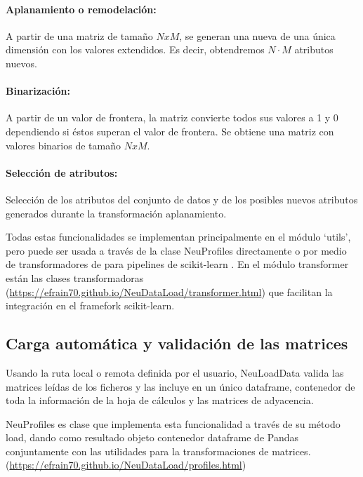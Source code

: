 \paragraph{Aplanamiento o remodelación:}
A partir de una matriz de tamaño $NxM$, se generan una nueva de una única dimensión con los valores extendidos. Es decir, obtendremos $N·M$ atributos nuevos.

\paragraph{Binarización:} A partir de un valor de frontera, la matriz convierte todos sus valores a 1 y 0 dependiendo si éstos superan el valor de frontera. Se obtiene una matriz con valores binarios de tamaño $NxM$.

\paragraph{Selección de atributos:} Selección de los atributos del conjunto de datos y de los posibles nuevos atributos generados durante la transformación aplanamiento. 

Todas estas funcionalidades se implementan principalmente en el módulo ‘utils’, pero puede ser usada a través de la clase NeuProfiles directamente o por medio de transformadores de para pipelines de scikit-learn \cite{Scikit-learn:Documentation}. En el módulo transformer están las clases transformadoras (\url{https://efrain70.github.io/NeuDataLoad/transformer.html}) que facilitan la integración en el framefork scikit-learn.

\subsection{Carga automática y validación de las matrices}
Usando la ruta local o remota definida por el usuario, NeuLoadData valida las matrices leídas de los ficheros y las incluye en un único dataframe, contenedor de toda la información de la hoja de cálculos y las matrices de adyacencia.

NeuProfiles es clase que implementa esta funcionalidad a través de su método load, dando como resultado objeto contenedor dataframe de Pandas \cite{PythonLibrary} conjuntamente con las utilidades para la transformaciones de matrices. (\url{https://efrain70.github.io/NeuDataLoad/profiles.html})

